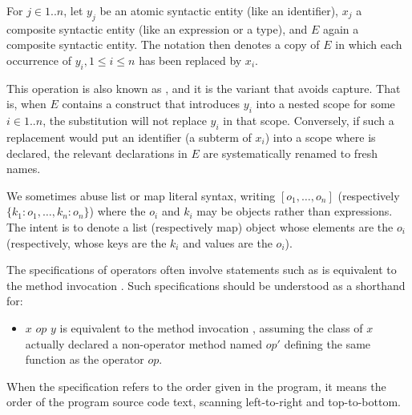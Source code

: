 \documentclass[makeidx]{article}
\begin{document}
\LMHash{}%
For $j \in 1 .. n$,
let $y_j$ be an atomic syntactic entity (like an identifier),
$x_j$ a composite syntactic entity (like an expression or a type),
and $E$ again a composite syntactic entity.
The notation
then denotes a copy of $E$
in which each occurrence of $y_i, 1 \le i \le n$ has been replaced by $x_i$.

\LMHash{}%
This operation is also known as ,
and it is the variant that avoids capture.
That is, when $E$ contains a construct that introduces $y_i$ into a nested scope for some $i \in 1 .. n$,
the substitution will not replace $y_i$ in that scope.
Conversely, if such a replacement would put an identifier \id{} (a subterm of $x_i$) into a scope where \id{} is declared,
the relevant declarations in $E$ are systematically renamed to fresh names.


\LMHash{}%
We sometimes abuse list or map literal syntax, writing $[o_1, \ldots, o_n]$ (respectively $\{k_1: o_1, \ldots, k_n: o_n\}$) where the $o_i$ and $k_i$ may be objects rather than expressions.
The intent is to denote a list (respectively map) object whose elements are the $o_i$ (respectively, whose keys are the $k_i$ and values are the $o_i$).

\LMHash{}%
The specifications of operators often involve statements such as
is equivalent to the method invocation
.
Such specifications should be understood as a shorthand for:
\begin{itemize}
\item
  $x$ $op$ $y$ is equivalent to the method invocation
  ,
  assuming the class of $x$ actually declared a non-operator method named $op'$
  defining the same function as the operator $op$.
\end{itemize}


\LMHash{}%
When the specification refers to the order given in the program, it means the order of the program source code text, scanning left-to-right and top-to-bottom.
\end{document}
